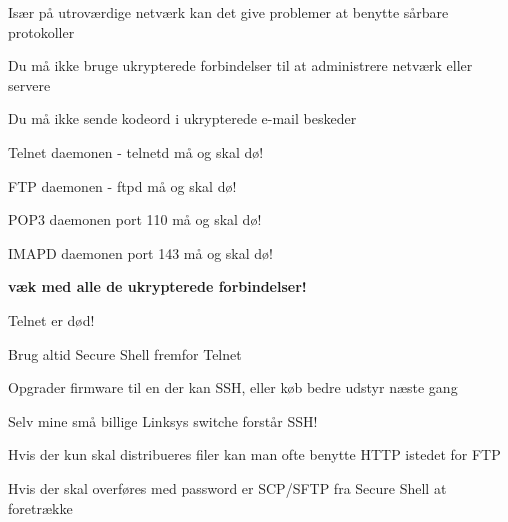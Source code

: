 \documentclass[Screen16to9,17pt]{foils}
\begin{document}


\begin{list1}
\item Især på utroværdige netværk kan det give problemer at benytte
  sårbare protokoller
\end{list1}


\begin{list1}
\item Du må ikke bruge ukrypterede forbindelser til at administrere netværk eller servere
\item Du må ikke sende kodeord i ukrypterede e-mail beskeder
\end{list1}

\centerline{\hlkbig Telnet daemonen - telnetd må og skal dø!}

\pause
\centerline{\hlkbig FTP daemonen - ftpd må og skal dø!}

\pause
\centerline{\hlkbig POP3 daemonen port 110 må og skal dø!}

\pause
\centerline{\hlkbig IMAPD daemonen port 143 må og skal dø!}

\pause
\vskip 1cm
\centerline{\hlkbig\bf væk med alle de ukrypterede forbindelser!}


\begin{list1}
\item Telnet er død!
\item Brug altid Secure Shell fremfor Telnet
\item Opgrader firmware til en der kan SSH, eller køb bedre udstyr næste gang
\item Selv mine små billige Linksys switche forstår SSH!
\end{list1}


\begin{list1}
\item Hvis der kun skal distribueres filer kan man ofte benytte HTTP istedet for FTP
\item Hvis der skal overføres med password er SCP/SFTP fra Secure Shell at foretrække
\end{list1}


\end{document}
